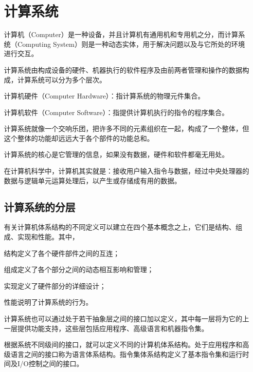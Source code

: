 \part{计算系统}

计算机（Computer）是一种设备，并且计算机有通用机和专用机之分，而计算系统（Computing System）则是一种动态实体，用于解决问题以及与它所处的环境进行交互。

计算系统由构成设备的硬件、机器执行的软件程序及由前两者管理和操作的数据构成，计算系统可以分为多个层次。

\begin{compactitem}
\item 计算机硬件（Computer Hardware）：指计算系统的物理元件集合。
\item 计算机软件（Computer Software）：指提供计算机执行的指令的程序集合。
\end{compactitem}

计算系统就像一个交响乐团，把许多不同的元素组织在一起，构成了一个整体，但这个整体的功能却远远大于各个部件的功能总和。

计算系统的核心是它管理的信息，如果没有数据，硬件和软件都毫无用处。

在计算机科学中，计算机其实就是：接收用户输入指令与数据，经过中央处理器的数据与逻辑单元运算处理后，以产生或存储成有用的数据。

\chapter{计算系统的分层}

有关计算机体系结构的不同定义可以建立在四个基本概念之上，它们是结构、组成、实现和性能。其中，
\begin{compactitem}
\item 结构定义了各个硬件部件之间的互连；
\item 组成定义了各个部分之间的动态相互影响和管理；
\item 实现定义了硬件部分的详细设计；
\item 性能说明了计算系统的行为。
\end{compactitem}

计算系统也可以通过处于若干抽象层之间的接口加以定义，其中每一层将为它的上一层提供功能支持，这些层包括应用程序、高级语言和机器指令集。

根据系统不同级间的接口，就可以定义不同的计算机体系结构。处于应用程序和高级语言之间的接口称为语言体系结构。指令集体系结构定义了基本指令集和运行时间及I/O控制之间的接口。

